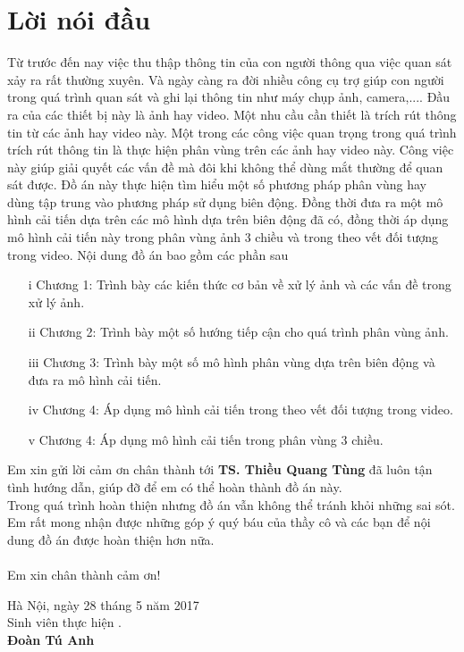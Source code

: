 \documentclass[12pt,oneside,a4]{report}
\begin{document}
\tableofcontents
\newpage
\listoffigures
\newpage
\newpage

%
\chapter*{Lời nói đầu}
Từ trước đến nay việc thu thập thông tin của con người thông qua việc quan sát xảy ra rất thường xuyên. Và ngày càng ra đời nhiều công cụ trợ giúp con người trong quá trình quan sát và ghi lại thông tin như máy chụp ảnh, camera,.... Đầu ra của các thiết bị này là ảnh hay video. Một nhu cầu cần thiết là trích rút thông tin từ các ảnh hay video này. Một trong các công việc quan trọng trong quá trình trích rút thông tin là thực hiện phân vùng trên các ảnh hay video này. Công việc này giúp giải quyết các vấn đề mà đôi khi không thể dùng mắt thường để quan sát được. Đồ án này thực hiện tìm hiểu một số phương pháp phân vùng hay dùng tập trung vào phương pháp sử dụng biên động. Đồng thời đưa ra một mô hình cải tiến dựa trên các mô hình dựa trên biên động đã có, đồng thời áp dụng mô hình cải tiến này trong phân vùng ảnh 3 chiều và trong theo vết đối tượng trong video. Nội dung đồ án bao gồm  các phần sau
\begin{itemize}
\item[i] Chương 1: Trình bày các kiến thức cơ bản về xử lý ảnh và các vấn đề trong xử lý ảnh.
\item[ii] Chương 2: Trình bày một số hướng tiếp cận cho quá trình phân vùng ảnh.
\item[iii] Chương 3: Trình bày một số mô hình phân vùng dựa trên biên động và đưa ra mô hình cải tiến.
\item[iv] Chương 4: Áp dụng mô hình cải tiến trong theo vết đối tượng trong video.
\item[v] Chương 4: Áp dụng mô hình cải tiến trong phân vùng 3 chiều.
\end{itemize}
 Em xin gửi lời cảm ơn chân thành  tới {\bf TS. Thiều Quang Tùng} đã luôn tận tình hướng dẫn, giúp đỡ để em có thể hoàn thành đồ án này.\\
Trong quá trình hoàn thiện nhưng đồ án vẫn không thể tránh khỏi những sai sót. Em rất mong nhận được những góp ý quý báu của thầy cô và các bạn để nội dung đồ án được hoàn thiện hơn nữa.\\\\
Em xin chân thành cảm ơn!\\


\begin{flushright}
Hà Nội, ngày 28 tháng 5 năm 2017\\[0.5cm]
{Sinh viên thực hiện \hspace*{1.4cm}.}\\[0.1cm]
\textbf{Đoàn Tú Anh\hspace*{2.0cm}}
\end{flushright}
\end{document}
